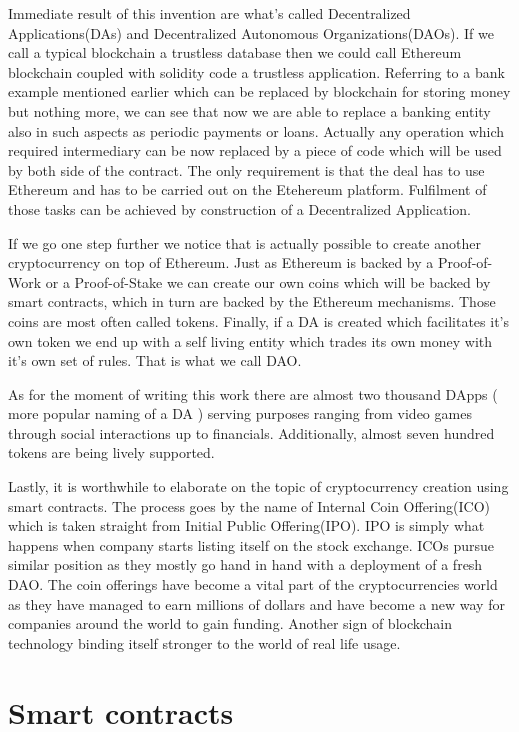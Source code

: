 \documentclass[a4paper,12pt,twoside,openany]{report}
\begin{document}
Immediate result of this invention are what's called Decentralized Applications(DAs) and Decentralized Autonomous Organizations(DAOs). If we call a typical blockchain a trustless database then we could call Ethereum blockchain coupled with solidity code a trustless application. Referring to a bank example mentioned earlier which can be replaced by blockchain for storing money but nothing more, we can see that now we are able to replace a banking entity also in such aspects as periodic payments or loans. Actually any operation which required intermediary can be now replaced by a piece of code which will be used by both side of the contract. The only requirement is that the deal has to use Ethereum and has to be carried out on the Etehereum platform. Fulfilment of those tasks can be achieved by construction of a Decentralized Application. 

If we go one step further we notice that is actually possible to create another cryptocurrency on top of Ethereum. Just as Ethereum is backed by a Proof-of-Work or a Proof-of-Stake we can create our own coins which will be backed by smart contracts, which in turn are backed by the Ethereum mechanisms. Those coins are most often called tokens. Finally, if a DA is created which facilitates it's own token we end up with a self living entity which trades its own money with it's own set of rules. That is what we call DAO.

As for the moment of writing this work there are almost two thousand DApps ( more popular naming of a DA ) serving purposes ranging from video games through social interactions up to financials. \cite{dapps} Additionally, almost seven hundred tokens are being lively supported. \cite{tokens}

Lastly, it is worthwhile to elaborate on the topic of cryptocurrency creation using smart contracts. The process goes by the name of Internal Coin Offering(ICO) which is taken straight from Initial Public Offering(IPO). IPO is simply what happens when company starts listing itself on the stock exchange. ICOs  pursue similar position as they mostly go hand in hand with a deployment of a fresh DAO. The coin offerings have become a vital part of the cryptocurrencies world as they have managed to earn millions of dollars and have become a new way for companies around the world to gain funding. Another sign of blockchain technology binding itself stronger to the world of real life usage.

\section{Smart contracts}
\end{document}
